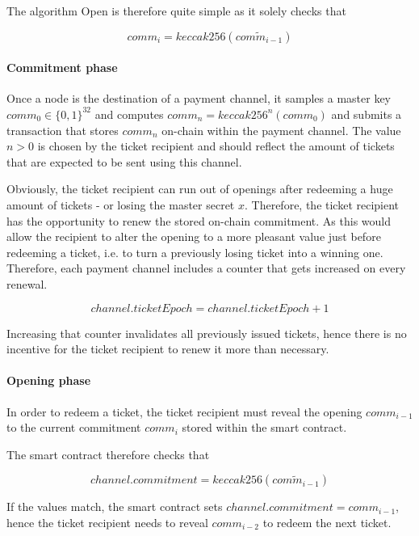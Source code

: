 The algorithm \textsf{Open} is therefore quite simple as it solely checks that

$$ comm_i = keccak256 (\widetilde{comm_{i-1}}) $$

\paragraph{Commitment phase}
\label{sec:incentives:commitment:commitmentphase}

Once a node is the destination of a payment channel, it samples a master key $comm_0 \in \{0, 1\}^{32}$ and computes $comm_n = keccak256^n(comm_0)$ and submits a transaction that stores $comm_n$ on-chain within the payment channel. The value $n > 0$ is chosen by the ticket recipient and should reflect the amount of tickets that are expected to be sent using this channel.

Obviously, the ticket recipient can run out of openings after redeeming a huge amount of tickets - or losing the master secret $x$. Therefore, the ticket recipient has the opportunity to renew the stored on-chain commitment. As this would allow the recipient to alter the opening to a more pleasant value just before redeeming a ticket, i.e. to turn a previously losing ticket into a winning one. Therefore, each payment channel includes a counter that gets increased on every renewal.

$$ channel.ticketEpoch = channel.ticketEpoch + 1 $$

Increasing that counter invalidates all previously issued tickets, hence there is no incentive for the ticket recipient to renew it more than necessary.

\paragraph{Opening phase}

In order to redeem a ticket, the ticket recipient must reveal the opening $comm_{i-1}$ to the current commitment $comm_i$ stored within the smart contract.

The smart contract therefore checks that

$$ channel.commitment = keccak256 (\widetilde{comm_{i-1}}) $$

If the values match, the smart contract sets $channel.commitment = comm_{i-1}$, hence the ticket recipient needs to reveal $comm_{i-2}$ to redeem the next ticket.
